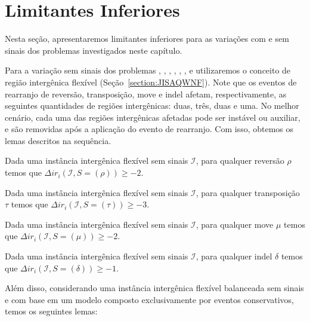 \section{Limitantes Inferiores}

Nesta seção, apresentaremos limitantes inferiores para as variações com e sem sinais dos problemas investigados neste capítulo.

Para a variação sem sinais dos problemas \SbFIR{}, \SbFIRI{}, \SbFIRM{}, \SbFIRMI{}, \SbFIRT{}, \SbFIRTI{}, \SbFIRTM{} e  \SbFIRTMI{} utilizaremos o conceito de região intergênica flexível (Seção~\ref{section:JISAQWNF}). Note que os eventos de rearranjo de reversão, transposição, move e indel afetam, respectivamente, as seguintes quantidades de regiões intergênicas: duas, três, duas e uma. No melhor cenário, cada uma das regiões intergênicas afetadas pode ser instável ou auxiliar, e são removidas após a aplicação do evento de rearranjo. Com isso, obtemos os lemas descritos na sequência.

\begin{lemma}\label{lemma:VJKGLBQG}
Dada uma instância intergênica flexível sem sinais $\mathcal{I}$, para qualquer reversão $\rho$ temos que $\Delta ir_i(\mathcal{I}, S = (\rho)) \ge -2$.
\end{lemma}

\begin{lemma}\label{lemma:XLUTQDGV}
Dada uma instância intergênica flexível sem sinais $\mathcal{I}$, para qualquer transposição $\tau$ temos que $\Delta ir_i(\mathcal{I}, S = (\tau)) \ge -3$.
\end{lemma}

\begin{lemma}\label{lemma:ZOCGWWGV}
Dada uma instância intergênica flexível sem sinais $\mathcal{I}$, para qualquer move $\mu$ temos que $\Delta ir_i(\mathcal{I}, S = (\mu)) \ge -2$.
\end{lemma}

\begin{lemma}\label{lemma:HQJMMZCU}
Dada uma instância intergênica flexível sem sinais $\mathcal{I}$, para qualquer indel $\delta$ temos que $\Delta ir_i(\mathcal{I}, S = (\delta)) \ge -1$.
\end{lemma}

Além disso, considerando uma instância intergênica flexível balanceada sem sinais e com base em um modelo composto exclusivamente por eventos conservativos, temos os seguintes lemas:

